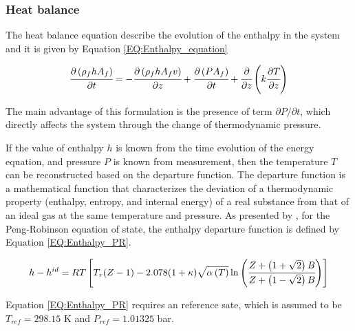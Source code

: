 \documentclass[../Article_Model_Parameters.tex]{subfiles}
\begin{document}
			
							
			\subsubsection{Heat balance} \label{CH: heat_balance}
			
			The heat balance equation describe the evolution of the enthalpy in the system and it is given by Equation \ref{EQ:Enthalpy_equation}
			
			{\footnotesize
				\begin{equation} \label{EQ:Enthalpy_equation}
					\cfrac{\partial \left(\rho_f {\color{black}h} A_f\right)}{\partial t} = - \cfrac{\partial \left( \rho_f {\color{black}h} A_f v \right)}{\partial z} + \cfrac{\partial \left(P A_f\right)}{\partial t} + \cfrac{\partial}{\partial z} \left( k \cfrac{\partial T}{\partial z} \right)
				\end{equation}
			}
			
			The main advantage of this formulation is the presence of term $\partial P / \partial t $, which directly affects the system through the change of thermodynamic pressure. 
			
			If the value of enthalpy $h$ is known from the time evolution of the energy equation, and pressure $P$ is known from measurement, then the temperature $T$ can be reconstructed based on the departure function. The departure function is a mathematical function that characterizes the deviation of a thermodynamic property (enthalpy, entropy, and internal energy) of a real substance from that of an ideal gas at the same temperature and pressure. As presented by \citet{Gmehling2019}, for the Peng-Robinson equation of state, the enthalpy departure function is defined by Equation \ref{EQ:Enthalpy_PR}.
			
			{\scriptsize
				\begin{equation}
					{\color{black}h}-{\color{black}h}^{id}={\color{black}R}T \left[{\color{black}T_r}({\color{black}Z}-1) -2.078(1+{\color{black}\kappa} ){\sqrt { {\color{black}\alpha}\left(T\right) } } \ln \left(\cfrac{{\color{black}Z}+\left( 1+\sqrt{2} \right){\color{black}B}}{{\color{black}Z}+\left( 1-\sqrt{2} \right){\color{black}B}}\right)\right]
					\label{EQ:Enthalpy_PR}
				\end{equation}				
			}
			
			Equation \ref{EQ:Enthalpy_PR} requires an reference sate, which is assumed to be $T_{ref}=298.15$ K and $P_{ref}=1.01325$ bar.
			
\end{document}
